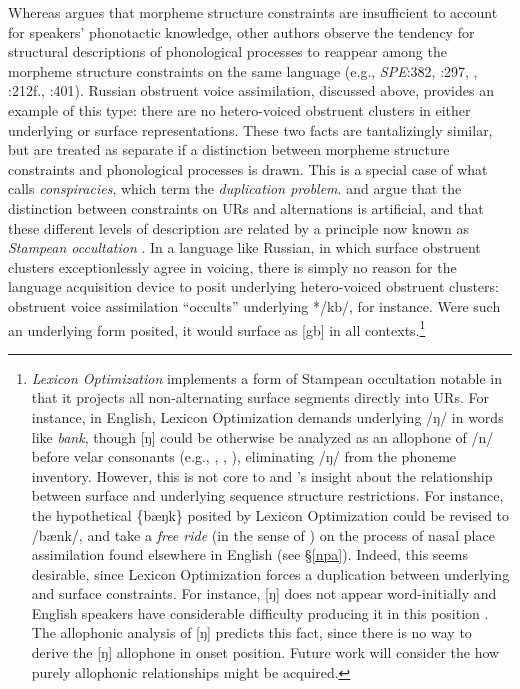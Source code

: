 Whereas \citeauthor{Shibatani1973} argues that morpheme structure constraints are insufficient to account for speakers' phonotactic knowledge, other authors observe the tendency for structural descriptions of phonological processes to reappear among the morpheme structure constraints on the same language (e.g., \emph{SPE}:382, \citealt{Hale1965}:297, \citealt{Kisseberth1970b}, 
\citealt{Postal1968}:212f., \citet{Stanley1967}:401).
Russian obstruent voice assimilation, discussed above, provides an example of this type: there are no hetero-voiced obstruent clusters in either underlying or surface representations.
These two facts are tantalizingly similar, but are treated as separate if a distinction between morpheme structure constraints and phonological processes is drawn.
This is a special case of what \citet{Kisseberth1970b} calls \emph{conspiracies}, which \citet[136]{KK77} term the \emph{duplication problem}.
\citet[205f.]{Dell1973} and \citet[28f.]{Stampe1973} argue that the distinction between constraints on URs and alternations is artificial, and that these different levels of description are related by a principle now known as \emph{Stampean occultation} \citep[54]{OT}.
In a language like Russian, in which surface obstruent clusters exceptionlessly agree in voicing, there is simply no reason for the language acquisition device to posit underlying hetero-voiced obstruent clusters: obstruent voice assimilation ``occults'' underlying */kb/, for instance. Were such an underlying form posited, it would surface as [gb] in all contexts.\footnote{
    \emph{Lexicon Optimization} \citep[209]{OT} implements a form of Stampean occultation notable in that it projects all non-alternating surface segments directly into URs.
    For instance, in English, Lexicon Optimization demands underlying /ŋ/ in words like \emph{bank}, though [ŋ] could be otherwise be analyzed as an allophone of /n/ before velar consonants (e.g., \citealt[65f.]{Borowsky1986}, \citealt[85]{SPE}, \citealt[62]{Halle1985a}), eliminating /ŋ/ from the phoneme inventory.
    However, this is not core to \citeauthor{Dell1973} and \citeauthor{Stampe1973}'s insight about the relationship between surface and underlying sequence structure restrictions.
    For instance, the hypothetical \{bæŋk\} posited by Lexicon Optimization could be revised to /bænk/, and take a \emph{free ride} (in the sense of \citealt{Zwicky1970}) on the process of nasal place assimilation found elsewhere in English (see \S\ref{npa}).
    Indeed, this seems desirable, since Lexicon Optimization forces a duplication between underlying and surface constraints.
    For instance, [ŋ] does not appear word-initially and English speakers have considerable difficulty producing it in this position \citep{Rusaw2009}.
    The allophonic analysis of [ŋ] predicts this fact, since there is no way to derive the [ŋ] allophone in onset position.
    Future work will consider the how purely allophonic relationships might be acquired.}
